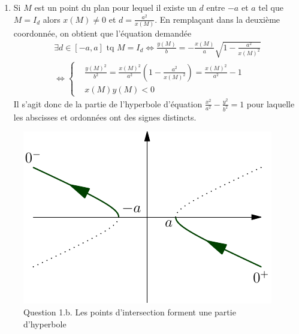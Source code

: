 \begin{enumerate}
\begin{enumerate}
 \item Si $M$ est un point du plan pour lequel il existe un $d$ entre $-a$ et $a$ tel que $M=I_d$ alors $x(M)\neq 0$ et $d=\frac{a^2}{x(M)}$. En remplaçant dans la deuxième coordonnée, on obtient que l'équation demandée
\begin{multline*}
 \exists d\in [-a,a]\text{ tq } M=I_d \Leftrightarrow
\frac{y(M)}{b} = -\frac{x(M)}{a}\sqrt{1-\frac{a^2}{x(M)^2}}\\
\Leftrightarrow
\left\lbrace 
\begin{aligned}
 &\frac{y(M)^2}{b^2} = \frac{x(M)^2}{a^2}(1-\frac{a^2}{x(M)^2}) = \frac{x(M)^2}{a^2} -1 \\ &x(M)y(M)<0
\end{aligned}
\right. 
\end{multline*}
Il s'agit donc de la partie de l'hyperbole d'équation $\frac{x^2}{a^2} -\frac{y^2}{b^2}=1$ pour laquelle les abscisses et ordonnées ont des signes distincts.
\end{enumerate} 
\begin{figure}[h!t]
 \centering
 \includegraphics{./Cellipse1_1.pdf}
 \caption{Question 1.b. Les points d'intersection forment une partie d'hyperbole}
 \label{fig:Cellipse1_1}
\end{figure}


\end{enumerate}
